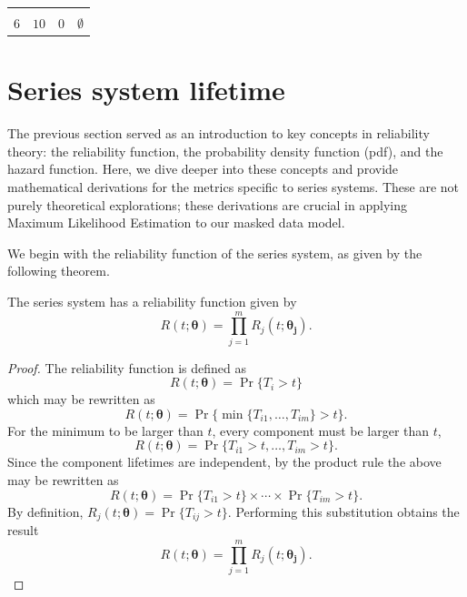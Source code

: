 \documentclass[
]{article}
\begin{document}
\begin{longtable}[]{@{}llll@{}}
\begin{minipage}[t]{0.23\columnwidth}
\end{minipage}\tabularnewline
\begin{minipage}[t]{0.07\columnwidth}\raggedright
6\strut
\end{minipage} & \begin{minipage}[t]{0.30\columnwidth}\raggedright
\(10\)\strut
\end{minipage} & \begin{minipage}[t]{0.30\columnwidth}\raggedright
0\strut
\end{minipage} & \begin{minipage}[t]{0.23\columnwidth}\raggedright
\(\emptyset\)\strut
\end{minipage}\tabularnewline
\bottomrule
\end{longtable}

\hypertarget{sec:ttf}{%
\section{Series system lifetime}\label{sec:ttf}}

The previous section served as an introduction to key concepts in
reliability theory: the reliability function, the probability density
function (pdf), and the hazard function. Here, we dive deeper into these
concepts and provide mathematical derivations for the metrics specific
to series systems. These are not purely theoretical explorations; these
derivations are crucial in applying Maximum Likelihood Estimation to our
masked data model.

We begin with the reliability function of the series system, as given by
the following theorem.

\begin{theorem}
\label{thm:sys_reliability_function}
The series system has a reliability function given by
\begin{equation}
\label{eq:sys_reliability_function}
  R(t;\boldsymbol{\theta}) = \prod_{j=1}^m R_j(t;\boldsymbol{\theta_j}).
\end{equation}
\end{theorem}
\begin{proof}
The reliability function is defined as
$$
  R(t;\boldsymbol{\theta}) = \Pr\{T_i > t\}
$$
which may be rewritten as
$$
  R(t;\boldsymbol{\theta}) = \Pr\{\min\{T_{i 1},\ldots,T_{i m}\} > t\}.
$$
For the minimum to be larger than $t$, every component must be larger than $t$,
$$
  R(t;\boldsymbol{\theta}) = \Pr\{T_{i 1} > t,\ldots,T_{i m} > t\}.
$$
Since the component lifetimes are independent, by the product rule the above may
be rewritten as
$$
  R(t;\boldsymbol{\theta}) = \Pr\{T_{i 1} > t\} \times \cdots \times \Pr\{T_{i m} > t\}.
$$
By definition, $R_j(t;\boldsymbol{\theta}) = \Pr\{T_{i j} > t\}$.
Performing this substitution obtains the result
$$
  R(t;\boldsymbol{\theta}) = \prod_{j=1}^m R_j(t;\boldsymbol{\theta_j}).
$$
\end{proof}
\end{document}
